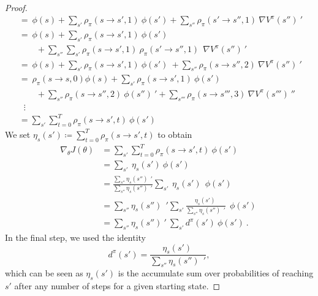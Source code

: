 \begin{proof}
\begin{align*}
		&=  \: \phi(s) + \sum_{s'} \rho_\pi (s \to s', 1) \: \phi(s') + \sum_{s''} \rho_\pi (s' \to s'', 1) \: \nabla V^\pi(s'') \:' \: \:  \\ 
		&=  \: \phi(s) + \sum_{s'} \rho_\pi (s \to s', 1) \: \phi(s') \: \\
		&\qquad + \sum_{s''}\sum_{s'} \rho_\pi (s \to s', 1) \: \rho_\pi (s' \to s'', 1) \ \: \nabla V^\pi(s'') \:' \: \:  \\ 
		&=  \: \phi(s) + \sum_{s'} \rho_\pi (s \to s', 1) \: \phi(s') \: + \sum_{s''} \rho_\pi (s \to s'', 2) \: \nabla V^\pi(s'') \:' \:  \\
		&=  \: \rho_\pi (s \to s, 0) \phi(s) + \sum_{s'} \rho_\pi (s \to s', 1) \: \phi(s') \: \\ 
		&\qquad + \sum_{s''} \rho_\pi (s \to s'', 2) \: \phi(s'') \:' + \sum_{s'''} \rho_\pi (s \to s''', 3) \: \nabla V^\pi(s''') \:'' \:  \\
		&\;\;\vdots \\
		&=  \sum_{s'} \sum^T_{t=0} \rho_\pi (s \to s', t) \: \phi(s') \: \: 
	\end{align*}
	We set \(\eta_s(s') \coloneqq \sum^T_{t=0} \rho_\pi (s \to s', t)\) to obtain 
	\begin{align}
		\nabla_\theta J(\theta) &=  \sum_{s'} \sum^T_{t=0} \rho_\pi (s \to s', t) \: \phi(s') \: \:  \nonumber \\
		&= \sum_{s'}  \: \eta_s(s') \: \phi(s') \:  \: \nonumber \\
		&= \frac{\sum_{s''}  \eta_s(s'') \:  \:'}{\sum_{s''}  \eta_s(s'') \:  \:'} \sum_{s'}  \: \eta_s(s') \:  \: \phi(s') \: \nonumber \\
		&= \sum_{s''}  \eta_s(s'') \:  \:' \sum_{s'} \frac{ \eta_s(s') \: }{\sum_{s''}  \eta_s(s'') \:  \:'} \:  \: \phi(s') \: \nonumber \\
		&=  \sum_{s''} \eta_s(s'') \:' \:  \sum_{s'} d^\pi(s') \: \phi(s') \:. \label{eq:pgproof_6}
	\end{align}
	In the final step, we used the identity \[d^\pi(s') = \frac{ \eta_s(s') \: }{\sum_{s''}  \eta_s(s'') \:  \:'},\]
	which can be seen as \(\eta_s(s')\) is the accumulate sum over probabilities of reaching \(s'\) after any number of steps for a given starting state. 
    	

\end{proof}

